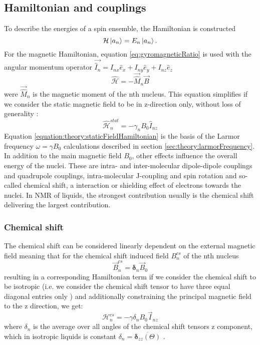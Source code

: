         \subsection{Hamiltonian and couplings}
            To describe the energies of a spin ensemble, the Hamiltonian is constructed
            \begin{equation*}
                \mathcal{H}\ket{a_n} = E_n \ket{a_n}.
            \end{equation*}
            For the magnetic Hamiltonian, equation \ref{eq:gyromagneticRatio} is used with the angular momentum operator $\vec{\hat I_n} = I_{nx}\hat{e}_x + I_{ny}\hat{e}_y + I_{nz} \hat{e}_z$
            \begin{equation}
                \mathcal{\hat H} = - \vec{\hat M}_n \vec B
            \end{equation}
            were $\vec{\hat M}_n $ is the magnetic moment of the nth nucleus. This equation simplifies if we consider the static magnetic field to be in z-direction only, without loss of generality \cite{ashok_lectures_2013}:
            \begin{equation}
                \label{equation:theory:staticFieldHamiltonian}
                \mathcal{\hat H}_n^{stat} = - \gamma_n B_0 \hat{I}_{nz}
            \end{equation}
            Equation \ref{equation:theory:staticFieldHamiltonian} is the basis of the Larmor frequency $\omega = \gamma B_0$ calculations described in section \ref{sec:theory:larmorFrequency}.
            In addition to the main magnetic field $B_0$, other effects influence the overall energy of the nuclei. These are intra- and inter-molecular dipole-dipole couplings and quadrupole couplings, intra-molecular J-coupling and spin rotation and so-called chemical shift, a interaction or shielding effect of electrons towards the nuclei.
            In NMR of liquids, the strongest contribution usually is the chemical shift delivering the largest contribution. 
        \subsubsection{Chemical shift}
        \label{sec:theory:chemicalShift}
            The chemical shift can be considered linearly dependent on the external magnetic field meaning that for the chemical shift induced field $B_n^{cs}$ of the nth nucleus
            \begin{equation}
                \vec B_n^{cs} = \boldsymbol\delta_n \vec B_0
            \end{equation}
            resulting in a corresponding Hamiltonian term if we consider the chemical shift to be isotropic (i.e. we consider the chemical shift tensor to have three equal diagonal entries only \cite{levitt_spin_nodate}) and additionally constraining the principal magnetic field to the z direction, we get:
            \begin{equation}
                \mathcal H_n^{cs} = -\gamma \delta_n B_0 \vec I_{nz}
            \end{equation}
            where $\delta_n$ is the average over all angles of the chemical shift tensors z component, which in isotropic liquids is constant $\delta_n = \overline{ \boldsymbol\delta_{zz}(\Theta)}$ \cite{abraham_proton_1997}.
